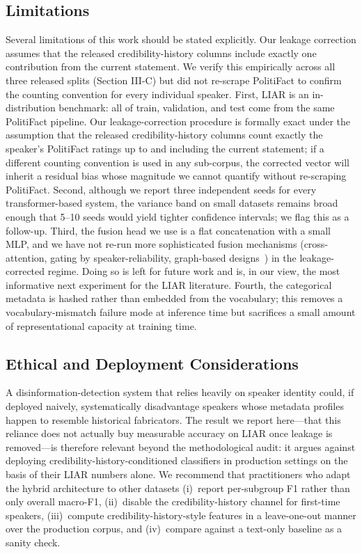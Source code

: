 \documentclass[journal]{IEEEtran}
\begin{document}
\subsection{Limitations}
Several limitations of this work should be stated explicitly. Our leakage correction assumes that the released credibility-history columns include exactly one contribution from the current statement. We verify this empirically across all three released splits (Section III-C) but did not re-scrape PolitiFact to confirm the counting convention for every individual speaker. First, LIAR is an in-distribution benchmark: all of train, validation, and test come from the same PolitiFact pipeline. Our leakage-correction procedure is formally exact under the assumption that the released credibility-history columns count exactly the speaker's PolitiFact ratings up to and including the current statement; if a different counting convention is used in any sub-corpus, the corrected vector will inherit a residual bias whose magnitude we cannot quantify without re-scraping PolitiFact. Second, although we report three independent seeds for every transformer-based system, the variance band on small datasets remains broad enough that 5--10 seeds would yield tighter confidence intervals; we flag this as a follow-up. Third, the fusion head we use is a flat concatenation with a small MLP, and we have not re-run more sophisticated fusion mechanisms (cross-attention, gating by speaker-reliability, graph-based designs~\cite{zhang2024heterosgt}) in the leakage-corrected regime. Doing so is left for future work and is, in our view, the most informative next experiment for the LIAR literature. Fourth, the categorical metadata is hashed rather than embedded from the vocabulary; this removes a vocabulary-mismatch failure mode at inference time but sacrifices a small amount of representational capacity at training time.

\subsection{Ethical and Deployment Considerations}
A disinformation-detection system that relies heavily on speaker identity could, if deployed naively, systematically disadvantage speakers whose metadata profiles happen to resemble historical fabricators. The result we report here---that this reliance does not actually buy measurable accuracy on LIAR once leakage is removed---is therefore relevant beyond the methodological audit: it argues against deploying credibility-history-conditioned classifiers in production settings on the basis of their LIAR numbers alone. We recommend that practitioners who adapt the hybrid architecture to other datasets (i)~report per-subgroup F1 rather than only overall macro-F1, (ii)~disable the credibility-history channel for first-time speakers, (iii)~compute credibility-history-style features in a leave-one-out manner over the production corpus, and (iv)~compare against a text-only baseline as a sanity check.
\end{document}
